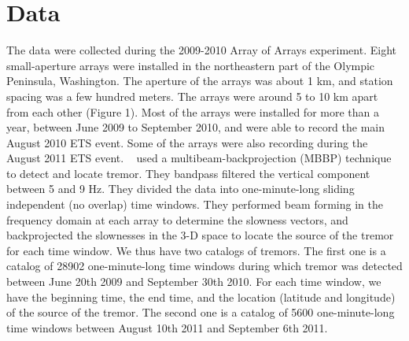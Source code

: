 \documentclass[draft]{agujournal2019}
\begin{document}
%

\section{Data}

The data were collected during the 2009-2010 Array of Arrays experiment. Eight small-aperture arrays were installed in the northeastern part of the Olympic Peninsula, Washington. The aperture of the arrays was about 1 km, and station spacing was a few hundred meters. The arrays were around 5 to 10 km apart from each other (Figure 1). Most of the arrays were installed for more than a year, between June 2009 to September 2010, and were able to record the main August 2010 ETS event. Some of the arrays were also recording during the August 2011 ETS event. ~ used a multibeam-backprojection (MBBP) technique to detect and locate tremor. They bandpass filtered the vertical component between 5 and 9 Hz. They divided the data into one-minute-long sliding independent (no overlap) time windows. They performed beam forming in the frequency domain at each array to determine the slowness vectors, and backprojected the slownesses in the 3-D space to locate the source of the tremor for each time window. We thus have two catalogs of tremors. The first one is a catalog of 28902 one-minute-long time windows during which tremor was detected between June 20th 2009 and September 30th 2010. For each time window, we have the beginning time, the end time, and the location (latitude and longitude) of the source of the tremor. The second one is a catalog of 5600 one-minute-long time windows between August 10th 2011 and September 6th 2011.
\end{document}
